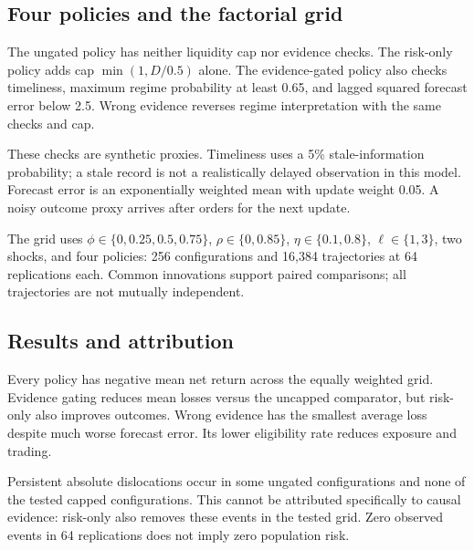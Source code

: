 \subsection{Four policies and the factorial grid}
The ungated policy has neither liquidity cap nor evidence checks. The risk-only policy adds cap $\min(1,D/0.5)$ alone. The evidence-gated policy also checks timeliness, maximum regime probability at least 0.65, and lagged squared forecast error below 2.5. Wrong evidence reverses regime interpretation with the same checks and cap.

These checks are synthetic proxies. Timeliness uses a 5\% stale-information probability; a stale record is not a realistically delayed observation in this model. Forecast error is an exponentially weighted mean with update weight 0.05. A noisy outcome proxy arrives after orders for the next update.

The grid uses $\phi\in\{0,0.25,0.5,0.75\}$, $\rho\in\{0,0.85\}$, $\eta\in\{0.1,0.8\}$, $\ell\in\{1,3\}$, two shocks, and four policies: 256 configurations and 16,384 trajectories at 64 replications each. Common innovations support paired comparisons; all trajectories are not mutually independent.

\subsection{Results and attribution}

Every policy has negative mean net return across the equally weighted grid. Evidence gating reduces mean losses versus the uncapped comparator, but risk-only also improves outcomes. Wrong evidence has the smallest average loss despite much worse forecast error. Its lower eligibility rate reduces exposure and trading.

Persistent absolute dislocations occur in some ungated configurations and none of the tested capped configurations. This cannot be attributed specifically to causal evidence: risk-only also removes these events in the tested grid. Zero observed events in 64 replications does not imply zero population risk.

